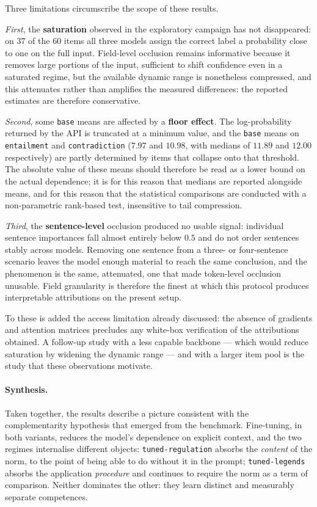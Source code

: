 \documentclass[pdflatex, sn-apa]{sn-jnl}%
\theoremstyle{thmstyleone}%
\theoremstyle{thmstyletwo}%
\theoremstyle{thmstylethree}%
\newcommand{\modelbase}{\texttt{base}}
\newcommand{\modellegends}{\texttt{tuned-legends}}
\newcommand{\modelreg}{\texttt{tuned-regulation}}
\begin{document}
Three limitations circumscribe the scope of these results.

\emph{First}, the \textbf{saturation} observed in the exploratory campaign has not
disappeared: on $37$ of the $60$ items all three models assign the correct label a
probability close to one on the full input. Field-level occlusion remains
informative because it removes large portions of the input, sufficient to shift
confidence even in a saturated regime, but the available dynamic range is
nonetheless compressed, and this attenuates rather than amplifies the measured
differences: the reported estimates are therefore conservative.

\emph{Second}, some \modelbase{} means are affected by a \textbf{floor effect}. The
log-probability returned by the API is truncated at a minimum value, and the
\modelbase{} means on \texttt{entailment} and \texttt{contradiction} ($7.97$ and
$10.98$, with medians of $11.89$ and $12.00$ respectively) are partly determined
by items that collapse onto that threshold. The absolute value of these means
should therefore be read as a lower bound on the actual dependence; it is for this
reason that medians are reported alongside means, and for this reason that the
statistical comparisons are conducted with a non-parametric rank-based test,
insensitive to tail compression.

\emph{Third}, the \textbf{sentence-level} occlusion produced no usable signal:
individual sentence importances fall almost entirely below $0.5$ and do not order
sentences stably across models. Removing one sentence from a three- or
four-sentence scenario leaves the model enough material to reach the same
conclusion, and the phenomenon is the same, attenuated, one that made token-level
occlusion unusable. Field granularity is therefore the finest at which this
protocol produces interpretable attributions on the present setup.

To these is added the access limitation already discussed: the absence of
gradients and attention matrices precludes any white-box verification of the
attributions obtained. A follow-up study with a less capable backbone --- which
would reduce saturation by widening the dynamic range --- and with a larger item
pool is the study that these observations motivate.

\paragraph{Synthesis.}
Taken together, the results describe a picture consistent with the
complementarity hypothesis that emerged from the benchmark. Fine-tuning, in both
variants, reduces the model's dependence on explicit context, and the two regimes
internalise different objects: \modelreg{} absorbs the \emph{content} of the norm,
to the point of being able to do without it in the prompt; \modellegends{} absorbs
the application \emph{procedure} and continues to require the norm as a term of
comparison. Neither dominates the other: they learn distinct and measurably
separate competences.
\end{document}
